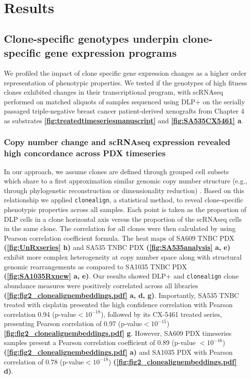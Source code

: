 
\section{Results}

\subsection{Clone-specific genotypes underpin clone-specific gene expression programs}
We profiled the impact of clone specific gene expression changes as a higher order representation of phenotypic properties. We tested if the genotypes of high fitness clones exhibited changes in their transcriptional program, with scRNAseq performed on matched aliquots of samples sequenced using DLP+ on the serially passaged triple-negative breast cancer patient-derived xenografts from Chapter 4 as substrates \textbf{\autoref{fig:treatedtimeseriesmanuscript}} and \textbf{\autoref{fig:SA535CX5461} a}.

\subsubsection{Copy number change and scRNAseq expression revealed high concordance across PDX timeseries}
  In our approach, we assume clones are defined through grouped cell subsets which share to a first approximation similar genomic copy number structure (e.g., through phylogenetic reconstruction or dimensionality reduction) \cite{laks2019clonal}. Based on this relationship we applied
  \texttt{clonealign}, a statistical method, \cite{campbell2019clonealign} to reveal clone-specific phenotypic properties across all samples.
  Each point is taken as the proportion of DLP cells in a clone horizontal axis versus the proportion of the scRNAseq cells in the same clone. The  correlation for all clones were then calculated by using Pearson correlation coefficient formula. The heat maps of SA609 TNBC PDX \textbf{(\autoref{fig:UnRxseries} h)} and SA535 TNBC PDX \textbf{(\autoref{fig:SA535analysis} a, e)} exhibit more complex heterogeneity at copy number space along with structural genomic rearrangements as compared to SA1035 TNBC PDX \textbf{(\autoref{fig:SA1035Rxnew} a, e)}. Our results showed DLP+ and \texttt{clonealign} clone abundance measures were positively correlated across all libraries \textbf{(\autoref{fig:fig2_clonealignembeddings.pdf} a, d, g)}. Importantly, SA535 TNBC treated with cisplatin presented the high confidence correlation with Pearson correlation 0.94 (p-value$< 10^{-18}$), followed by its CX-5461 treated series, presenting Pearson correlation of 0.97 (p-value$< 10^{-15}$) \textbf{\autoref{fig:fig2_clonealignembeddings.pdf} g}. However, SA609 PDX timeseries samples present a Pearson correlation coefficient of 0.89 (p-value $< 10^{-16}$) \textbf{(\autoref{fig:fig2_clonealignembeddings.pdf} a)} and SA1035 PDX with Pearson correlation of 0.78 (p-value$< 10^{-18}$) \textbf{(\autoref{fig:fig2_clonealignembeddings.pdf} d)}.
  
